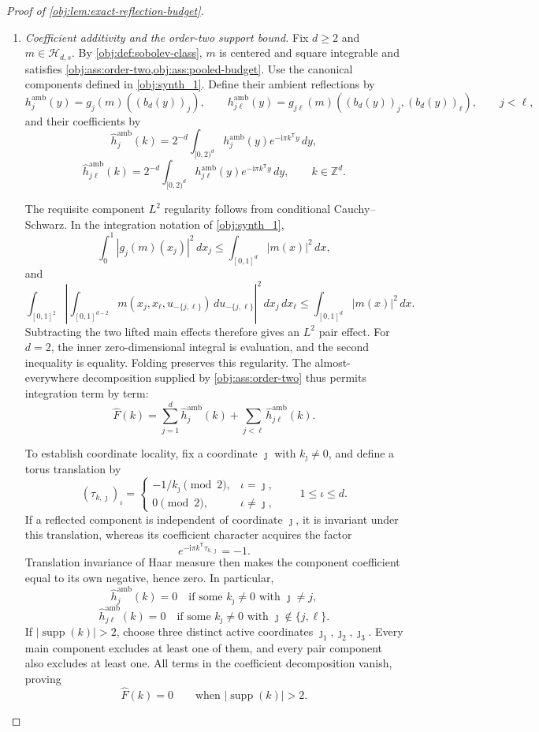 \documentclass[11pt]{article}
\begin{document}
\begin{proof}[Proof of \cref{obj:lem:exact-reflection-budget}]
\begin{enumerate}
\item \textit{Coefficient additivity and the order-two support bound.}
Fix \(d\geq2\) and \(m\in\mathcal H_{d,s}\). By \cref{obj:def:sobolev-class}, \(m\) is centered and square integrable and satisfies \cref{obj:ass:order-two,obj:ass:pooled-budget}. Use the canonical components defined in \cref{obj:synth_1}. Define their ambient reflections by
\[
h_j^{\mathrm{amb}}(y)
=
g_j(m)((b_d(y))_j),
\qquad
h_{j\ell}^{\mathrm{amb}}(y)
=
g_{j\ell}(m)((b_d(y))_j,(b_d(y))_\ell),
\qquad j<\ell,
\]
and their coefficients by
\[
\widehat h_j^{\mathrm{amb}}(k)
=
2^{-d}\int_{[0,2)^d}
h_j^{\mathrm{amb}}(y)e^{-\mathrm i\pi k^{\mathsf T}y}\,dy,
\]
\[
\widehat h_{j\ell}^{\mathrm{amb}}(k)
=
2^{-d}\int_{[0,2)^d}
h_{j\ell}^{\mathrm{amb}}(y)e^{-\mathrm i\pi k^{\mathsf T}y}\,dy,
\qquad k\in\mathbb Z^d.
\]

The requisite component \(L^2\) regularity follows from conditional Cauchy--Schwarz. In the integration notation of \cref{obj:synth_1},
\[
\int_0^1|g_j(m)(x_j)|^2\,dx_j
\leq
\int_{[0,1]^d}|m(x)|^2\,dx,
\]
and
\[
\int_{[0,1]^2}
\left|
\int_{[0,1]^{d-2}}
m(x_j,x_\ell,u_{-\{j,\ell\}})\,du_{-\{j,\ell\}}
\right|^2\,dx_j\,dx_\ell
\leq
\int_{[0,1]^d}|m(x)|^2\,dx.
\]
Subtracting the two lifted main effects therefore gives an \(L^2\) pair effect. For \(d=2\), the inner zero-dimensional integral is evaluation, and the second inequality is equality. Folding preserves this regularity. The almost-everywhere decomposition supplied by \cref{obj:ass:order-two} thus permits integration term by term:
\[
\widehat F(k)
=
\sum_{j=1}^d\widehat h_j^{\mathrm{amb}}(k)
+
\sum_{j<\ell}\widehat h_{j\ell}^{\mathrm{amb}}(k).
\]

To establish coordinate locality, fix a coordinate \(\jmath\) with
\(k_\jmath\neq0\), and define a torus translation by
\[
(\tau_{k,\jmath})_\iota
=
\begin{cases}
-1/k_\jmath\pmod{2},&\iota=\jmath,\\
0\pmod{2},&\iota\neq\jmath,
\end{cases}
\qquad 1\leq\iota\leq d.
\]
If a reflected component is independent of coordinate \(\jmath\), it is invariant under this translation, whereas its coefficient character acquires the factor
\[
e^{-\mathrm i\pi k^{\mathsf T}\tau_{k,\jmath}}=-1.
\]
Translation invariance of Haar measure then makes the component coefficient equal to its own negative, hence zero. In particular,
\[
\widehat h_j^{\mathrm{amb}}(k)=0
\quad\text{if some }k_\jmath\neq0\text{ with }\jmath\neq j,
\]
\[
\widehat h_{j\ell}^{\mathrm{amb}}(k)=0
\quad\text{if some }k_\jmath\neq0\text{ with }\jmath\notin\{j,\ell\}.
\]
If \(|\operatorname{supp}(k)|>2\), choose three distinct active coordinates
\(\jmath_1,\jmath_2,\jmath_3\). Every main component excludes at least one of them, and every pair component also excludes at least one. All terms in the coefficient decomposition vanish, proving
\[
\widehat F(k)=0
\qquad\text{when }|\operatorname{supp}(k)|>2.
\]


\end{enumerate}
\end{proof}
\end{document}
